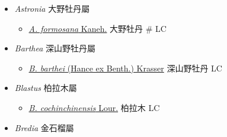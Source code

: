 
  \begin{itemize}
 \item[] \textit{Astronia} 大野牡丹屬
                                
  \begin{itemize}
        \item[] \href{http://www.theplantlist.org/tpl1.1/search?q=Astronia+formosana}{\textit{A. formosana} Kaneh.}   大野牡丹  \# LC
  \end{itemize}
 \item[] \textit{Barthea} 深山野牡丹屬
                                
  \begin{itemize}
        \item[] \href{http://www.theplantlist.org/tpl1.1/search?q=Barthea+barthei}{\textit{B. barthei} (Hance ex Benth.) Krasser}   深山野牡丹   LC
  \end{itemize}
 \item[] \textit{Blastus} 柏拉木屬
                                
  \begin{itemize}
        \item[] \href{http://www.theplantlist.org/tpl1.1/search?q=Blastus+cochinchinensis}{\textit{B. cochinchinensis} Lour.}   柏拉木   LC
  \end{itemize}
 \item[] \textit{Bredia} 金石榴屬
                                

\end{itemize}
